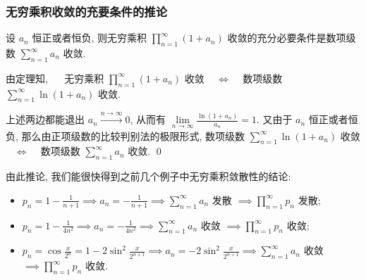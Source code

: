 \begin{frame}
\frametitle{无穷乘积收敛的充要条件的推论}

\begin{cor}
设 $a_n$ 恒正或者恒负, 则无穷乘积 $\prod_{n=1}^\infty (1 + a_n)$ 收敛的充分必要条件是数项级数 $\sum_{n=1}^\infty a_n$ 收敛.
\end{cor}

\startproof[bg=yellow, fg=red]
由定理知, ~~ 无穷乘积 $\prod_{n=1}^\infty (1 + a_n)$ 收敛 ~ $\Longleftrightarrow$ ~ 数项级数 $\sum_{n=1}^\infty \ln (1 + a_n)$ 收敛.

上述两边都能退出 $a_n \xrightarrow[]{n \to \infty} 0$, 从而有 $\lim\limits_{n \to \infty} \frac{\ln (1 + a_n)}{a_n} = 1$. 又由于 $a_n$ 恒正或者恒负, 那么由\alert{正项级数的比较判别法的极限形式}, 数项级数 $\sum_{n=1}^\infty \ln (1 + a_n)$ 收敛 ~ $\Longleftrightarrow$ ~ 数项级数 $\sum_{n=1}^\infty a_n$ 收敛.
\qed

\pause

由此推论, 我们能很快得到之前几个例子中无穷乘积敛散性的结论:
\begin{itemize}
\item $p_n = 1 - \frac{1}{n+1} \implies a_n = -\frac{1}{n+1} \implies \sum_{n=1}^\infty a_n$ 发散 $\implies \prod_{n=1}^\infty p_n$ 发散;
\item $p_n = 1 - \frac{1}{4n^2} \implies a_n = -\frac{1}{4n^2} \implies \sum_{n=1}^\infty a_n$ 收敛 $\implies \prod_{n=1}^\infty p_n$ 收敛;
\item $p_n = \cos \frac{x}{2^{n}} = 1 - 2\sin^2 \frac{x}{2^{n+1}} \implies a_n = -2\sin^2 \frac{x}{2^{n+1}} \implies \sum_{n=1}^\infty a_n$ 收敛 $\implies \prod_{n=1}^\infty p_n$ 收敛.
\end{itemize}

\end{frame}


